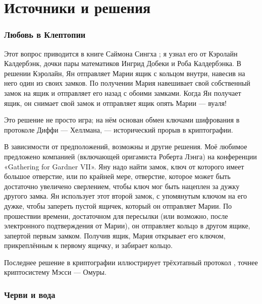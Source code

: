 \section*{Источники и решения}

\subsubsection*{Любовь в Клептопии}

Этот вопрос приводится в книге Саймона Сингха \cite{53};
я узнал его от Кэролайн Калдербэнк, дочки пары математиков Ингрид Добеки и Роба Калдербэнка.
В решении Кэролайн, Ян отправляет Марии ящик с кольцом внутри, навесив на него один из своих замков.
По получении Мария навешивает свой собственный замок на ящик и отправляет его назад с обоими замками.
Когда Ян получает ящик, он снимает свой замок и отправляет ящик опять Марии --- вуаля!

Это решение не просто игра;
на нём основан обмен ключами шифрования в протоколе Диффи — Хеллмана, --- исторический прорыв в криптографии.

В зависимости от предположений, возможны и другие решения.
Моё любимое предложено компанией (включающей оригамиста Роберта Лэнга) на конференции
«Ga\-the\-ring for Gardner VII».
Яну надо найти замок, ключ от которого имеет большое отверстие, или по крайней мере, отверстие, которое может быть достаточно увеличено сверлением, чтобы ключ мог быть нацеплен за дужку другого замка.
Ян использует этот второй замок, с упомянутым ключом на его дужке, чтобы запереть пустой ящичек, который он отправляет Марии.
По прошествии времени, достаточном для пересылки (или возможно, после электронного подтверждения от Марии), он отправляет кольцо в другом ящике, запертой первым замком.
Получив ящик, Мария открывает его ключом, прикреплённым к первому ящичку, и забирает кольцо.

\begin{addedbytheeditors}
Последнее решение в криптографии иллюстрирует трёхэтапный протокол \cite{three-pass_protocol}, точнее криптосистему Мэсси --- Омуры.\pr 
\end{addedbytheeditors}


\subsubsection*{Черви и вода}

